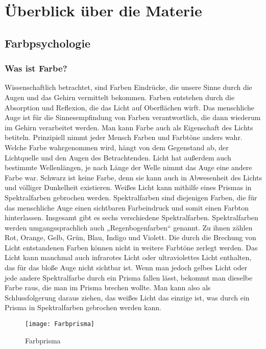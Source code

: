 \chapter{Überblick über die Materie}
\label{cha:sa_Einleitung}


\section{Farbpsychologie}

\subsection{Was ist Farbe?}
Wissenschaftlich betrachtet, sind Farben Eindrücke, die unsere Sinne durch die Augen und das Gehirn vermittelt bekommen. Farben entstehen durch die Absorption und Reflexion, die das Licht auf Oberflächen wirft. Das menschliche Auge ist für die Sinnesempfindung von Farben verantwortlich, die dann wiederum im Gehirn verarbeitet werden. Man kann Farbe auch als Eigenschaft des Lichts betiteln. Prinzipiell nimmt jeder Mensch Farben und Farbtöne anders wahr. Welche Farbe wahrgenommen wird, hängt von dem Gegenstand ab, der Lichtquelle und den Augen des Betrachtenden. Licht hat außerdem auch bestimmte Wellenlängen, je nach Länge der Welle nimmt das Auge eine andere Farbe war. Schwarz ist keine Farbe, denn sie kann auch in Abwesenheit des Lichts und völliger Dunkelheit existieren.
Weißes Licht kann mithilfe eines Prismas in Spektralfarben gebrochen werden. Spektralfarben sind diejenigen Farben, die für das menschliche Auge einen sichtbaren Farbeindruck und somit einen Farbton hinterlassen. Insgesamt gibt es sechs verschiedene Spektralfarben. Spektralfarben werden umgangssprachlich auch „Regenbogenfarben“ genannt. Zu ihnen zählen Rot, Orange, Gelb, Grün, Blau, Indigo und Violett. Die durch die Brechung von Licht entstandenen Farben können nicht in weitere Farbtöne zerlegt werden. Das Licht kann manchmal auch infrarotes Licht oder ultraviolettes Licht enthalten, das für das bloße Auge nicht sichtbar ist.
Wenn man jedoch gelbes Licht oder jede andere Spektralfarbe durch ein Prisma fallen lässt, bekommt man dieselbe Farbe raus, die man im Prisma brechen wollte. Man kann also als Schlussfolgerung daraus ziehen, das weißes Licht das einzige ist, was durch ein Prisma in Spektralfarben gebrochen werden kann.
\cite{mollica2018special}

\begin{figure}[H]
	\centering
	\texttt{[image: Farbprisma]}
	\caption{Farbprisma\cite{_basicColorTheory}}
\end{figure}

